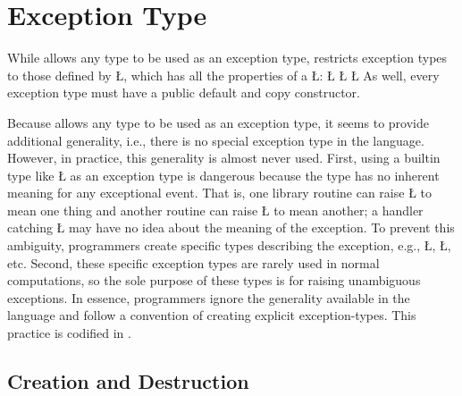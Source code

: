 \documentclass[openright,twoside]{report}
\begin{document}
\section{Exception Type}
\label{s:ExceptionType}

While \CC allows any type to be used as an exception type, \uC restricts exception types to those defined by \LGinlinetrue\LGbegin\lgrinde\L{}\endlgrinde\LGend{}, which has all the properties of a \LGinlinetrue\LGbegin\lgrinde\L{}\endlgrinde\LGend{}:
\LGinlinefalse\LGbegin\lgrinde
\L{}
\L{\LB{}}
\L{\LB{\};}}
\endlgrinde\LGend
As well, every exception type must have a public default and copy constructor.

\begin{annotation}
Because \CC allows any type to be used as an exception type, it seems to provide additional generality, i.e., there is no special exception type in the language.
However, in practice, this generality is almost never used.
First, using a builtin type like \LGinlinetrue\LGbegin\lgrinde\L{}\endlgrinde\LGend{} as an exception type is dangerous because the type has no inherent meaning for any exceptional event.
That is, one library routine can raise \LGinlinetrue\LGbegin\lgrinde\L{}\endlgrinde\LGend{} to mean one thing and another routine can raise \LGinlinetrue\LGbegin\lgrinde\L{}\endlgrinde\LGend{} to mean another;
a handler catching \LGinlinetrue\LGbegin\lgrinde\L{}\endlgrinde\LGend{} may have no idea about the meaning of the exception.
To prevent this ambiguity, programmers create specific types describing the exception, e.g., \LGinlinetrue\LGbegin\lgrinde\L{}\endlgrinde\LGend{}, \LGinlinetrue\LGbegin\lgrinde\L{}\endlgrinde\LGend{}, etc.
Second, these specific exception types are rarely used in normal computations, so the sole purpose of these types is for raising unambiguous exceptions.
In essence, \CC programmers ignore the generality available in the language and follow a convention of creating explicit exception-types.
This practice is codified in \uC.
\end{annotation}


\subsection{Creation and Destruction}
\end{document}
